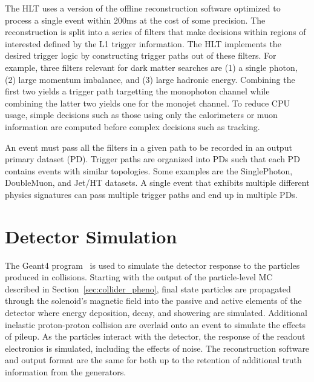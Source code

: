The HLT uses a version of the offline reconstruction software optimized to process a single event within 200\unit{ms} at the cost of some precision.
The reconstruction is split into a series of filters that make decisions within regions of interested defined by the L1 trigger information.
The HLT implements the desired trigger logic by constructing trigger paths out of these filters.
For example, three filters relevant for dark matter searches are (1) a single photon, (2) large momentum imbalance, and (3) large hadronic energy.
Combining the first two yields a trigger path targetting the monophoton channel while combining the latter two yields one for the monojet channel.
To reduce CPU usage, simple decisions such as those using only the calorimeters or muon information are computed before complex decisions such as tracking.

An event must pass all the filters in a given path to be recorded in an output primary dataset (PD).
Trigger paths are organized into PDs such that each PD contains events with similar topologies.
Some examples are the SinglePhoton, DoubleMuon, and Jet/HT datasets. 
A single event that exhibits multiple different physics signatures can pass multiple trigger paths and end up in multiple PDs.

\section{Detector Simulation}

The Geant4 program~\cite{Geant2003, Geant2006} is used to simulate the detector response to the particles produced in collisions.
Starting with the output of the particle-level MC described in Section~\ref{sec:collider_pheno}, final state particles are propagated through the solenoid's magnetic field into the passive and active elements of the detector where energy deposition, decay, and showering are simulated.
Additional inelastic proton-proton collision are overlaid onto an event to simulate the effects of pileup.
As the particles interact with the detector, the response of the readout electronics is simulated, including the effects of noise.
The reconstruction software and output format are the same for both up to the retention of additional truth information from the generators.
